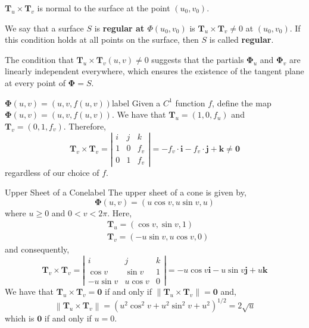 \begin{rmk}
	$\mathbf{T}_u \times \mathbf{T}_v$ is normal to the surface at the point $(u_0, v_0)$.
\end{rmk}

\begin{defn}
	\sloppy We say that a surface $S$ is \textbf{regular at $\Phi(u_0, v_0)$} is $\mathbf{T}_u \times \mathbf{T}_v \neq 0$ at $(u_0, v_0)$. If this condition holds at all points on the surface, then $S$ is called \textbf{regular}.
\end{defn}

\begin{marginfigure}
	The condition that $\mathbf{T}_u \times \mathbf{T}_v(u,v) \neq 0$ suggests that the partials $\mathbf{\Phi}_u$ and $\mathbf{\Phi}_v$ are linearly independent everywhere, which ensures the existence of the tangent plane at every point of $\mathbf{\Phi} = S$.
\end{marginfigure}

\begin{ex}{$\mathbf{\Phi}(u, v)=(u, v, f(u, v))$}{label}
	Given a $C^1$ function $f$, define the map $\mathbf{\Phi}(u, v)=(u, v, f(u, v))$. We have that $\mathbf{T}_u = (1, 0, f_u)$ and $\mathbf{T}_v = (0, 1, f_v)$. Therefore,
	\[\mathbf{T}_v \times \mathbf{T}_v=\left|\begin{array}{lll}
		i & j & k \\
		1 & 0 & f_v \\
		0 & 1 & f_v
		\end{array}\right|=-f_v \cdot \mathbf{i}-f_v \cdot \mathbf{j}+ \mathbf{k} \neq \mathbf{0}\]
		regardless of our choice of $f$.
\end{ex}

\begin{ex}{Upper Sheet of a Cone}{label}
	The upper sheet of a cone is given by,
	\[\mathbf{\Phi}(u, v)=(u \cos v, u \sin v, u)\]
	where $u \geq 0$ and $0 < v < 2 \pi$. Here,
	\begin{align*}
		&\mathbf{T}_u=(\cos v, \sin v, 1) \\
		&\mathbf{T}_v=(-u \sin v, u \cos v, 0)
	\end{align*}
	and consequently,
	\[\mathbf{T}_v \times \mathbf{T}_v=\left|\begin{array}{ccc}
	i & j & k \\
	\cos v & \sin v & 1 \\
	-u \sin v & u \cos v & 0
	\end{array}\right|=-u \cos v \mathbf{i}-u \sin v \mathbf{j}+u \mathbf{k}\]
	We have that $\mathbf{T}_u \times \mathbf{T}_v = \mathbf{0}$ if and only if $\|\mathbf{T}_u \times \mathbf{T}_v\| = \mathbf{0}$ and,
	\[\left\|\mathbf{T}_u \times \mathbf{T}_v\right\|=\left(u^2 \cos ^2 v+u^2 \sin ^2 v+u^2\right)^{1 / 2} = 2 \sqrt{u}\]
	which is $\mathbf{0}$ if and only if $u = 0$.
\end{ex}

